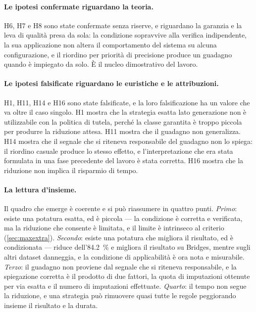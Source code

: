 \paragraph{Le ipotesi confermate riguardano la teoria.} H6, H7 e H8 sono state confermate senza
riserve, e riguardano la garanzia e la leva di qualità presa da sola: la condizione \Vtwo{}
sopravvive alla verifica indipendente, la sua applicazione non altera il comportamento del sistema
su alcuna configurazione, e il riordino per priorità di precisione produce un guadagno quando è
impiegato da solo. È il nucleo dimostrativo del lavoro.

\paragraph{Le ipotesi falsificate riguardano le euristiche e le attribuzioni.} H1, H11, H14 e H16
sono state falsificate, e la loro falsificazione ha un valore che va oltre il caso singolo. H1
mostra che la strategia esatta lato generazione non è utilizzabile con la politica di tutela,
perché la classe garantita è troppo piccola per produrre la riduzione attesa. H11 mostra che il
guadagno non generalizza. H14 mostra che il segnale che si riteneva responsabile del guadagno non
lo spiega: il riordino casuale produce lo stesso effetto, e l'interpretazione che era stata
formulata in una fase precedente del lavoro è stata corretta. H16 mostra che la riduzione non
implica il risparmio di tempo.

\paragraph{La lettura d'insieme.} Il quadro che emerge è coerente e si può riassumere in quattro
punti. \emph{Primo}: esiste una potatura esatta, ed è piccola --- la condizione \Vtwo{} è corretta
e verificata, ma la riduzione che consente è limitata, e il limite è intrinseco al criterio
(\autoref{sec:maxextra}). \emph{Secondo}: esiste una potatura che migliora il risultato, ed è
condizionata ---  riduce dell'\SI{84.2}{\percent} e migliora il risultato su Bridges,
mentre sugli altri dataset danneggia, e la condizione di applicabilità è ora nota e misurabile.
\emph{Terzo}: il guadagno non proviene dal segnale che si riteneva responsabile, e la spiegazione
corretta è il prodotto di due fattori, la quota di imputazioni ottenute per via esatta e il numero
di imputazioni effettuate. \emph{Quarto}: il tempo non segue la riduzione, e una strategia può
rimuovere quasi tutte le regole peggiorando insieme il risultato e la durata.

